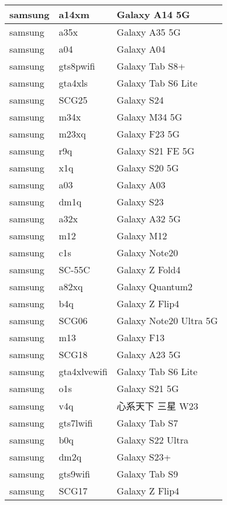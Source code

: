 \begin{tabularx}{\linewidth}{|l|X|X|}
        samsung & a14xm & Galaxy A14 5G \\ \hline
        samsung & a35x & Galaxy A35 5G \\ \hline
        samsung & a04 & Galaxy A04 \\ \hline
        samsung & gts8pwifi & Galaxy Tab S8+ \\ \hline
        samsung & gta4xls & Galaxy Tab S6 Lite \\ \hline
        samsung & SCG25 & Galaxy S24 \\ \hline
        samsung & m34x & Galaxy M34 5G \\ \hline
        samsung & m23xq & Galaxy F23 5G \\ \hline
        samsung & r9q & Galaxy S21 FE 5G \\ \hline
        samsung & x1q & Galaxy S20 5G \\ \hline
        samsung & a03 & Galaxy A03 \\ \hline
        samsung & dm1q & Galaxy S23 \\ \hline
        samsung & a32x & Galaxy A32 5G \\ \hline
        samsung & m12 & Galaxy M12 \\ \hline
        samsung & c1s & Galaxy Note20 \\ \hline
        samsung & SC-55C & Galaxy Z Fold4 \\ \hline
        samsung & a82xq & Galaxy Quantum2 \\ \hline
        samsung & b4q & Galaxy Z Flip4 \\ \hline
        samsung & SCG06 & Galaxy Note20 Ultra 5G \\ \hline
        samsung & m13 & Galaxy F13 \\ \hline
        samsung & SCG18 & Galaxy A23 5G \\ \hline
        samsung & gta4xlvewifi & Galaxy Tab S6 Lite \\ \hline
        samsung & o1s & Galaxy S21 5G \\ \hline
        samsung & v4q & 心系天下 三星 W23 \\ \hline
        samsung & gts7lwifi & Galaxy Tab S7 \\ \hline
        samsung & b0q & Galaxy S22 Ultra \\ \hline
        samsung & dm2q & Galaxy S23+ \\ \hline
        samsung & gts9wifi & Galaxy Tab S9 \\ \hline
        samsung & SCG17 & Galaxy Z Flip4 \\ \hline

\end{tabularx}
